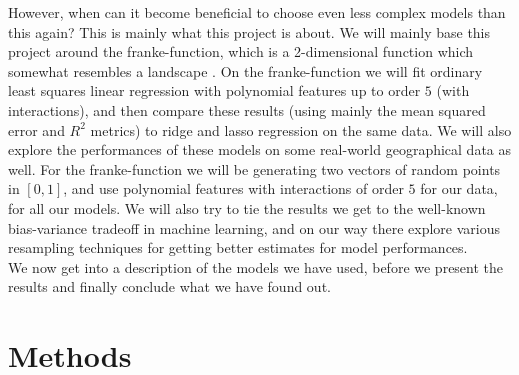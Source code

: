 \documentclass{article}
\begin{document}
However, when can it become beneficial to choose even less complex models than
this again? This is mainly what this project is about. We will mainly base this
project around the franke-function, which is a 2-dimensional function which
somewhat resembles a landscape \cite{franke2ddesc}. On the franke-function we
will fit ordinary least squares linear regression with polynomial features up to
order $5$ (with interactions), and then compare these results (using mainly the
mean squared error and $R^2$ metrics) to ridge and lasso regression on the
same data. We will also explore the performances of these models on some
real-world geographical data as well. For the franke-function we will be
generating two vectors of random points in $\left[ 0, 1 \right]$, and use
polynomial features with interactions of order $5$ for our data, for all our
models. We will also try to tie the results we get to the well-known
bias-variance tradeoff in machine learning, and on our way there explore various
resampling techniques for getting better estimates for model performances.
\\

We now get into a description of the models we have used, before we present the
results and finally conclude what we have found out.

\section{Methods}
\end{document}

